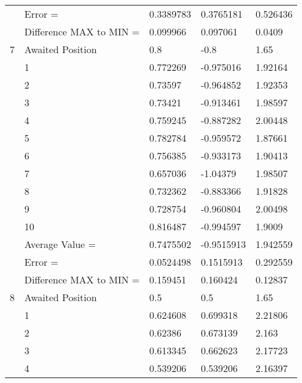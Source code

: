 \begin{tabular}{|p{2cm}|p{3cm}|p{3cm}|p{3cm}|p{3cm}|}
             & Error =                 & 0.3389783    & 0.3765181    & 0.526436   \\
             & Difference MAX to MIN = & 0.099966     & 0.097061     & 0.0409     \\
\hline
7            & Awaited Position        & 0.8          & -0.8         & 1.65       \\
             & 1                       & 0.772269     & -0.975016    & 1.92164    \\
             & 2                       & 0.73597      & -0.964852    & 1.92353    \\
             & 3                       & 0.73421      & -0.913461    & 1.98597    \\
             & 4                       & 0.759245     & -0.887282    & 2.00448    \\
             & 5                       & 0.782784     & -0.959572    & 1.87661    \\
             & 6                       & 0.756385     & -0.933173    & 1.90413    \\
             & 7                       & 0.657036     & -1.04379     & 1.98507    \\
             & 8                       & 0.732362     & -0.883366    & 1.91828    \\
             & 9                       & 0.728754     & -0.960804    & 2.00498    \\
             & 10                      & 0.816487     & -0.994597    & 1.9009     \\
             & Average Value =         & 0.7475502    & -0.9515913   & 1.942559   \\
             & Error =                 & 0.0524498    & 0.1515913    & 0.292559   \\
             & Difference MAX to MIN = & 0.159451     & 0.160424     & 0.12837    \\
\hline
8            & Awaited Position        & 0.5          & 0.5          & 1.65       \\
             & 1                       & 0.624608     & 0.699318     & 2.21806    \\
             & 2                       & 0.62386      & 0.673139     & 2.163      \\
             & 3                       & 0.613345     & 0.662623     & 2.17723    \\
             & 4                       & 0.539206     & 0.539206     & 2.16397    \\

\end{tabular}

